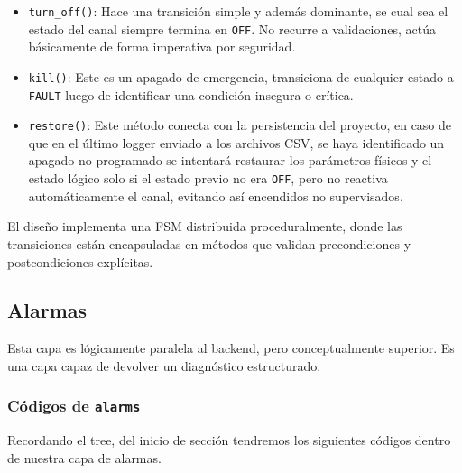 \documentclass{article}
\begin{document}
\begin{itemize}
    Durante la rampa, el sistema no asume que el hardware es intrínsecamente seguro. La transición a estado ON sólo ocurre tras verificación explícita de condiciones eléctricas y de estado interno.\\
    Ante cualquier condición anómala, el sistema ejecuta un apagado inmediato y retorna un estado de error. \\
    Esto convierte la fase de rampa en un proceso supervisado y no simplemente en un retardo pasivo, incrementando significativamente la robustez del sistema. 
    
    \item \texttt{turn\_off()}: Hace una transición simple y además dominante, se cual sea el estado del canal siempre termina en \texttt{OFF}. No recurre a validaciones, actúa básicamente de forma imperativa por seguridad. 

    \item \texttt{kill()}: Este es un apagado de emergencia, transiciona de cualquier estado a \texttt{FAULT} luego de identificar una condición insegura o crítica.

    \item \texttt{restore()}: Este método conecta con la persistencia del proyecto, en caso de que en el último logger enviado a los archivos CSV, se haya identificado un apagado no programado se intentará restaurar los parámetros físicos y el estado lógico solo si el estado previo no era \texttt{OFF}, pero no reactiva automáticamente el canal, evitando así encendidos no supervisados.  
\end{itemize}

El diseño implementa una FSM distribuida proceduralmente, donde las transiciones están encapsuladas en métodos que validan precondiciones y postcondiciones explícitas.

\subsection{Alarmas}
 
Esta capa es lógicamente paralela al backend, pero conceptualmente superior. Es una capa capaz de devolver un diagnóstico estructurado.
 \subsubsection{Códigos de \texttt{alarms}}
 
 Recordando el tree, del inicio de sección tendremos los siguientes códigos dentro de nuestra capa de alarmas. 
\end{document}
